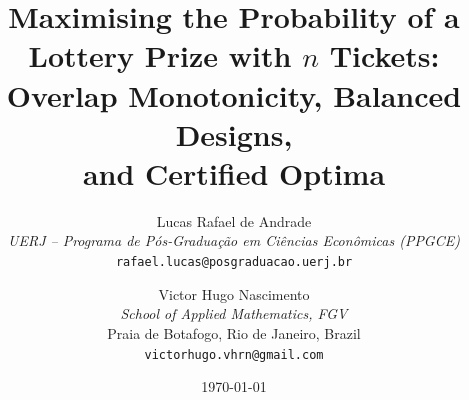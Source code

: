 \documentclass[12pt]{article}
\theoremstyle{plain}
\theoremstyle{definition}
\begin{document}

\title{%
  Maximising the Probability of a Lottery Prize with $n$ Tickets:\\
  Overlap Monotonicity, Balanced Designs,\\
  and Certified Optima
}

\author{%
  Lucas Rafael de Andrade\\[2pt]
  \small \textit{UERJ -- Programa de P\'{o}s-Gradua\c{c}\~{a}o em
    Ci\^{e}ncias Econ\^{o}micas (PPGCE)}\\
  \small \texttt{rafael.lucas@posgraduacao.uerj.br}
  \and
  Victor Hugo Nascimento\\[2pt]
  \small \textit{School of Applied Mathematics, FGV}\\
  \small Praia de Botafogo, Rio de Janeiro, Brazil\\
  \small \texttt{victorhugo.vhrn@gmail.com}
}

\date{\today}

\maketitle
\end{document}
